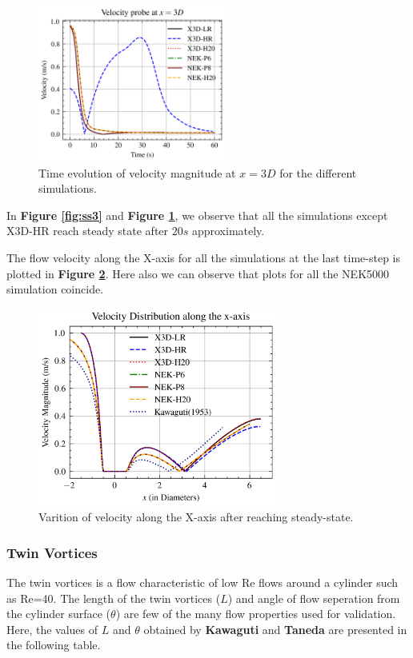 \documentclass[11pt]{article}
\begin{document}
\begin{figure}[H]
    \centering
    \includegraphics[width=0.55\textwidth]{../ss4dot5.png}
    \caption{Time evolution of velocity magnitude at $x=3 D$ for the different simulations.}
    \label{fig:ss4dot5}
\end{figure}

\noindent In \textbf{Figure \ref{fig:ss3}} and \textbf{Figure \ref{fig:ss4dot5}}, we observe that all the simulations except X3D-HR
reach steady state after $20s$ approximately.
\newpage

\noindent The flow velocity along the X-axis for all the simulations at the last time-step is plotted in \textbf{Figure \ref{fig:xv}}.
Here also we can observe that plots for all the NEK5000 simulation coincide.
\begin{figure}[H]
    \centering
    \includegraphics[width=0.7\textwidth]{../xv.png}
    \caption{Varition of velocity along the X-axis after reaching steady-state.}
    \label{fig:xv}
\end{figure}

\subsubsection*{Twin Vortices}
The twin vortices is a flow characteristic of low Re flows around a cylinder such as Re=40. The length of the twin vortices ($L$) and
angle of flow seperation from the cylinder surface ($\theta$) are few of the many flow properties used for validation.
Here, the values of $L$ and $\theta$ obtained by \textbf{Kawaguti} and \textbf{Taneda} are presented in the following table.
\end{document}
